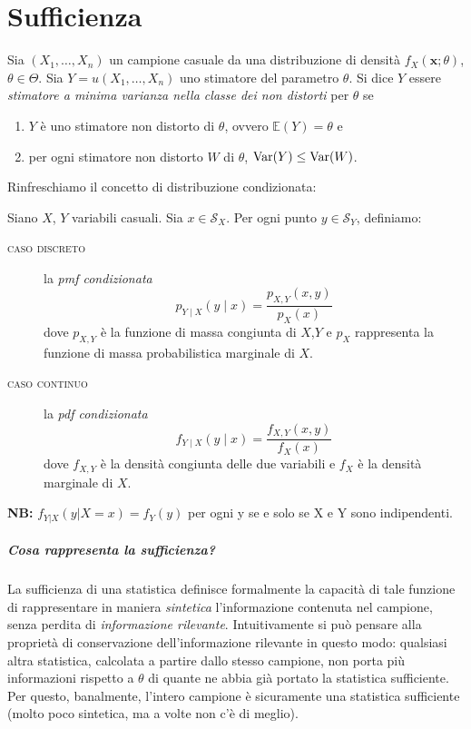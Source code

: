 
\chapter{Sufficienza}

\begin{dfn}
  Sia \((X_1,\dotsc,X_n)\) un campione casuale da una distribuzione di 
  densità \(f_X(\mathbf{x};\theta)\), \(\theta \in \Theta\). Sia
  \(Y = u(X_1,\dotsc,X_n)\) uno stimatore del parametro \(\theta\). Si dice
  \(Y\) essere \emph{stimatore a minima varianza nella classe dei non distorti} per \(\theta\) se
  \begin{enumerate}
    \item \(Y\) è uno stimatore non distorto di \(\theta\), ovvero
          \(\mathbb{E}(Y) = \theta\) e
    \item per ogni stimatore non distorto \(W\) di \(\theta\),
          \(\operatorname{Var}(Y) \le \operatorname{Var}(W)\).
  \end{enumerate}
\end{dfn}

Rinfreschiamo il concetto di distribuzione condizionata:
\begin{dfn}
Siano \(X\), \(Y\) variabili casuali. Sia \(x \in \mathcal{S}_X\).
Per ogni punto \(y \in \mathcal{S}_Y\), definiamo:
\begin{description}
  \item[\textsc{caso discreto}] la \emph{pmf condizionata}
  \begin{equation}
    p_{Y\mid X}(y \mid x) = \frac{p_{X,Y}(x,y)}{p_X(x)}
  \end{equation}
  dove \(p_{X,Y}\) è la funzione di massa congiunta di \(X\),\(Y\) e \(p_X\) rappresenta la funzione di massa probabilistica marginale di \(X\).
  \item[\textsc{caso continuo}] la \emph{pdf condizionata}
  \begin{equation}
    f_{Y\mid X}(y \mid x) = \frac{f_{X,Y}(x,y)}{f_X(x)}
  \end{equation}
  dove \(f_{X,Y}\) è la densità congiunta delle due variabili e \(f_X\) è la densità marginale di \(X\).
\end{description}
\end{dfn}

\noindent \textbf{NB:} $f_{Y|X}(y | X=x) = f_Y(y)$ per ogni y se e solo se X e Y sono indipendenti.

\paragraph{Cosa rappresenta la sufficienza?}
La sufficienza di una statistica definisce formalmente la capacità di tale funzione di rappresentare in maniera \emph{sintetica} l'informazione contenuta nel campione, senza perdita di \emph{informazione rilevante}.
Intuitivamente si può pensare alla proprietà di conservazione dell'informazione rilevante in questo modo: qualsiasi altra statistica, calcolata a partire dallo stesso campione, non porta più informazioni rispetto a \(\theta\) di quante ne abbia già portato la statistica sufficiente.
Per questo, banalmente, l'intero campione è sicuramente una statistica sufficiente (molto poco sintetica, ma a volte non c'è di meglio).

